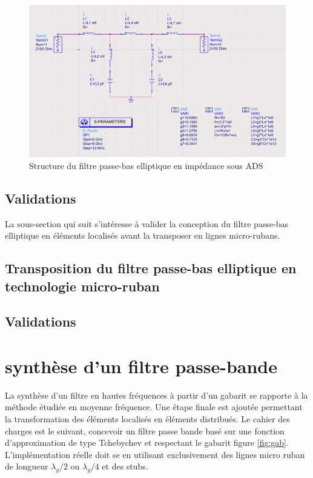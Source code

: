 \documentclass[french]{article}
\begin{document}
\begin{figure}[H]
	\centering
	\includegraphics[width=12cm]{../3synthPBas/elliptique/modele_ADS_elliptique.png}
	\caption{Structure du filtre passe-bas elliptique en impédance sous ADS}
	\label{fig:montage_ADS_elliptique}
\end{figure}

\newpage

\subsection*{Validations}

La sous-section qui suit s'intéresse à valider la conception du filtre passe-bas elliptique en éléments localisés avant la transposer en lignes micro-rubans.

\newpage

\subsection{Transposition du filtre passe-bas elliptique en technologie micro-ruban}

\subsection*{Validations}

\newpage

\section{synthèse d'un filtre passe-bande}

La synthèse d'un filtre en hautes fréquences à partir d'un gabarit se rapporte à la méthode étudiée en moyenne fréquence. Une étape finale est ajoutée permettant la transformation des éléments localisés en éléments distribués.
Le cahier des charges est le suivant, concevoir un filtre passe bande basé sur une fonction d'approximation de type Tchebychev et respectant le gabarit figure \ref{fig:gab}. L'implémentation réelle doit se en utilisant exclusivement des lignes micro ruban de longueur $\lambda_g/2$ ou $\lambda_g/4$ et des stubs.
\end{document}
